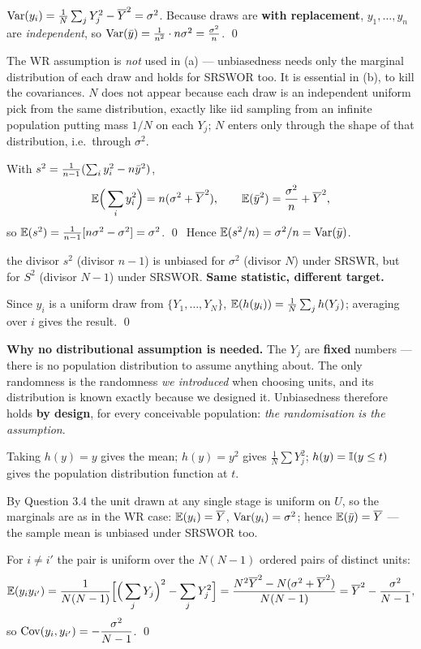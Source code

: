  $\operatorname{Var}(y_i)=\frac1N\sum_jY_j^2-\overline{Y}^2=\sigma^2$. Because draws are \textbf{with
replacement}, $y_1,\dots,y_n$ are \emph{independent}, so
$\operatorname{Var}(\bar{y})=\frac{1}{n^2}\cdot n\sigma^2=\frac{\sigma^2}{n}$. \qed

 The WR assumption is \emph{not} used in (a) --- unbiasedness needs only the marginal
distribution of each draw and holds for SRSWOR too. It is essential in (b), to kill the
covariances. $N$ does not appear because each draw is an independent uniform pick from the same
distribution, exactly like iid sampling from an infinite population putting mass $1/N$ on each
$Y_j$; $N$ enters only through the shape of that distribution, i.e.\ through $\sigma^2$.

\sol With $s^2=\frac1{n-1}(\sum_iy_i^2-n\bar{y}^2)$,
\[
  \mathbb{E}\Big(\sum_iy_i^2\Big)=n(\sigma^2+\overline{Y}^2),\qquad
  \mathbb{E}(\bar{y}^2)=\frac{\sigma^2}{n}+\overline{Y}^2 ,
\]
so $\mathbb{E}(s^2)=\frac{1}{n-1}[n\sigma^2-\sigma^2]=\sigma^2$. \qed\ Hence
$\mathbb{E}(s^2/n)=\sigma^2/n=\operatorname{Var}(\bar{y})$.

\begin{trap}{the divisor}
$s^2$ (divisor $n-1$) is unbiased for $\sigma^2$ (divisor $N$) under SRSWR, but for $S^2$
(divisor $N-1$) under SRSWOR. \textbf{Same statistic, different target.}
\end{trap}

\sol Since $y_i$ is a uniform draw from $\{Y_1,\dots,Y_N\}$,
$\mathbb{E}(h(y_i))=\frac1N\sum_jh(Y_j)$; averaging over $i$ gives the result. \qed

\textbf{Why no distributional assumption is needed.} The $Y_j$ are \textbf{fixed} numbers --- there
is no population distribution to assume anything about. The only randomness is the randomness
\emph{we introduced} when choosing units, and its distribution is known exactly because we
designed it. Unbiasedness therefore holds \textbf{by design}, for every conceivable population:
\emph{the randomisation is the assumption}.

Taking $h(y)=y$ gives the mean; $h(y)=y^2$ gives $\frac1N\sum Y_j^2$; $h(y)=\mathbb{I}(y\le t)$ gives the
population distribution function at $t$.

 By Question 3.4 the unit drawn at any single stage is uniform on $U$, so the marginals are
as in the WR case: $\mathbb{E}(y_i)=\overline{Y}$, $\operatorname{Var}(y_i)=\sigma^2$; hence $\mathbb{E}(\bar{y})=\overline{Y}$ --- the sample
mean is unbiased under SRSWOR too.

 For $i\ne i'$ the pair is uniform over the $N(N-1)$ ordered pairs of distinct units:
\[
  \mathbb{E}(y_iy_{i'})=\frac{1}{N(N-1)}\Big[\Big(\sum_jY_j\Big)^2-\sum_jY_j^2\Big]
  =\frac{N^2\overline{Y}^2-N(\sigma^2+\overline{Y}^2)}{N(N-1)}=\overline{Y}^2-\frac{\sigma^2}{N-1},
\]
so $\operatorname{Cov}(y_i,y_{i'})=-\dfrac{\sigma^2}{N-1}$. \qed

